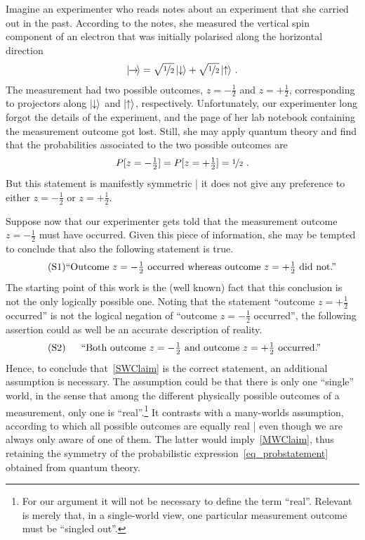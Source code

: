 \documentclass[12pt]{article}
\theoremstyle{plain}
\theoremstyle{definition}
\newcommand*{\ket}[1]{{| #1 \rangle}}
\newcommand*{\spinup}{\ket{{\hspace{-0.1ex}\uparrow\hspace{-0.1ex}}}}
\newcommand*{\spindown}{\ket{{\hspace{-0.1ex}\downarrow\hspace{-0.1ex}}}}
\newcommand*{\spinright}{\ket{{\hspace{-0.2ex}\rightarrow\hspace{-0.4ex}}}}
\newcommand*{\sminus}{{\textstyle - \frac{1}{2}}}
\newcommand*{\splus}{{\textstyle + \frac{1}{2}}}
\newcommand*{\mclaim}[1]{\begin{minipage}{0.8\textwidth} \begin{center}  #1 \end{center}\end{minipage}}
\begin{document}
Imagine an experimenter who reads notes about an experiment that she carried out in the past. According to the notes, she measured the vertical spin component of an electron that was initially polarised along the horizontal direction
\begin{align*}
  \spinright = \sqrt{\nicefrac{1}{2}} \, \spindown + \sqrt{\nicefrac{1}{2}} \, \spinup  \ .
\end{align*}
The measurement had two possible outcomes, $z = \sminus$ and $z = \splus$, corresponding to projectors along $\spindown$ and $\spinup$, respectively. Unfortunately, our experimenter long forgot the details of the experiment, and the page of her lab notebook containing the measurement outcome got lost. Still, she may apply quantum theory and find that the probabilities associated to the two possible outcomes are
\begin{align} \label{eq_probstatement}
  P[z = \sminus] = P[z = \splus] = \nicefrac{1}{2} \ .
\end{align}
But this statement is manifestly symmetric | it does not give any preference to either $z = \sminus$ or $z = \splus$. 


Suppose now that our experimenter gets told that the measurement outcome~$z = \sminus$ must have occurred. Given this piece of information, she may be tempted to conclude that also the following statement is true. 
\begin{align}
 \label{SWClaim} \tag{S1} \mclaim{``Outcome~$z = \sminus$ occurred whereas outcome~$z = \splus$ did not.''}
\end{align}
The starting point of this work is the (well known) fact that this conclusion is not the only logically possible one. Noting that the statement ``outcome $z = \splus$ occurred'' is not the logical negation of ``outcome $z = \sminus$ occurred'', the following assertion could as well be an accurate description of reality.
  \begin{align}
 \label{MWClaim} \tag{S2} \mclaim{``Both outcome~$z = \sminus$ and outcome~$z = \splus$ occurred.''} 
\end{align}
Hence, to conclude that~\eqref{SWClaim} is the correct statement, an additional assumption is necessary. The assumption could be that there is only one ``single'' world, in the sense that among the different physically possible outcomes of a measurement, only one is ``real''.\footnote{For our argument it will not be necessary to define the term ``real''.  Relevant is merely that, in a single-world view, one particular measurement outcome must be ``singled out''.}  It contrasts with a many-worlds assumption, according to which all possible outcomes are equally real | even though we are always only aware of one of them.  The latter would imply~\eqref{MWClaim}, thus retaining the symmetry of the probabilistic expression~\eqref{eq_probstatement} obtained from quantum theory.
\end{document}
